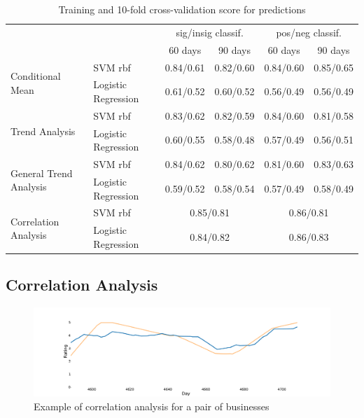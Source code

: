 \documentclass{vldb}
\begin{document}
\begin{table}[ht!]
\centering
\begin{tabular}{@{}llrrrr@{}}
\toprule
                                                              &                     & \multicolumn{2}{c}{sig/insig classif.} & \multicolumn{2}{c}{pos/neg classif.} \\ 
\cmidrule(r){3-4}
\cmidrule(r){5-6}
                                                              &                     & \multicolumn{1}{c}{60 days} & \multicolumn{1}{c}{90 days} & \multicolumn{1}{c}{60 days} & \multicolumn{1}{c}{90 days} \\ \midrule
\multirow{2}{*}{Conditional Mean}  & SVM rbf             &   0.84/0.61   &  0.82/0.60  & 0.84/0.60 &  0.85/0.65  \\
                                        & Logistic Regression & 0.61/0.52  & 0.60/0.52 &  0.56/0.49   &  0.56/0.49   \\ \midrule
\multirow{2}{*}{Trend Analysis}       & SVM rbf             & 0.83/0.62    &  0.82/0.59 & 0.84/0.60 & 0.81/0.58   \\
                                        & Logistic Regression &  0.60/0.55   & 0.58/0.48 &  0.57/0.49  &  0.56/0.51   \\ \midrule
\multirow{2}{*}{General Trend Analysis} & SVM rbf             & 0.84/0.62 & 0.80/0.62 &  0.81/0.60 &  0.83/0.63  \\
                                       & Logistic Regression &  0.59/0.52  & 0.58/0.54  &   0.57/0.49  &   0.58/0.49       \\ \midrule
\multirow{2}{*}{Correlation Analysis}   & SVM rbf             & \multicolumn{2}{c}{0.85/0.81}  & \multicolumn{2}{c}{0.86/0.81} \\
                                        & Logistic Regression & \multicolumn{2}{c}{0.84/0.82}  & \multicolumn{2}{c}{0.86/0.83} \\
\bottomrule
\end{tabular}
\caption{Training and 10-fold cross-validation score for predictions}
\label{tab:results}
\end{table}

\subsection*{Correlation Analysis}
\begin{figure}[h]
\centering
\includegraphics[width=\columnwidth]{corr.pdf}
\caption{Example of correlation analysis for a pair of businesses}
\end{figure}
\end{document}
